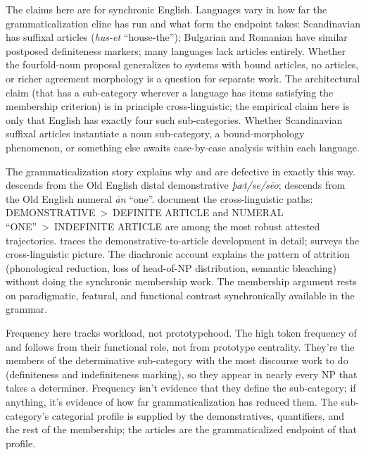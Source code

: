 \documentclass[12pt]{article}
\begin{document}
The claims here are for synchronic English. Languages vary in how far the grammaticalization cline has run and what form the endpoint takes: Scandinavian has suffixal articles (\textit{hus-et} \enquote{house-the}); Bulgarian and Romanian have similar postposed definiteness markers; many languages lack articles entirely. Whether the fourfold-noun proposal generalizes to systems with bound articles, no articles, or richer agreement morphology is a question for separate work. The architectural claim (that  has a sub-category wherever a language has items satisfying the membership criterion) is in principle cross-linguistic; the empirical claim here is only that English has exactly four such sub-categories. Whether Scandinavian suffixal articles instantiate a noun sub-category, a bound-morphology phenomenon, or something else awaits case-by-case analysis within each language.

The grammaticalization story explains why  and  are defective in exactly this way.  descends from the Old English distal demonstrative \textit{þæt/se/sēo};  descends from the Old English numeral \textit{ān} \enquote{one}. \textcite{heinekuteva2002lexicon} document the cross-linguistic paths: DEMONSTRATIVE~>~DEFINITE ARTICLE and NUMERAL \enquote{ONE}~>~INDEFINITE ARTICLE are among the most robust attested trajectories. \textcite{diessel1999} traces the demonstrative-to-article development in detail; \textcite[Ch.~9]{lyons1999} surveys the cross-linguistic picture. The diachronic account explains the pattern of attrition (phonological reduction, loss of head-of-NP distribution, semantic bleaching) without doing the synchronic membership work. The membership argument rests on paradigmatic, featural, and functional contrast synchronically available in the grammar.

Frequency here tracks workload, not prototypehood. The high token frequency of  and  follows from their functional role, not from prototype centrality. They're the members of the determinative sub-category with the most discourse work to do (definiteness and indefiniteness marking), so they appear in nearly every NP that takes a determiner. Frequency isn't evidence that they define the sub-category; if anything, it's evidence of how far grammaticalization has reduced them. The sub-category's categorial profile is supplied by the demonstratives, quantifiers, and the rest of the membership; the articles are the grammaticalized endpoint of that profile.
\end{document}
